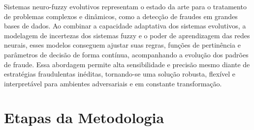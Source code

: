 
Sistemas neuro-fuzzy evolutivos representam o estado da arte para o tratamento de problemas complexos e dinâmicos, como a detecção de fraudes em grandes bases de dados. Ao combinar a capacidade adaptativa dos sistemas evolutivos, a modelagem de incertezas dos sistemas fuzzy e o poder de aprendizagem das redes neurais, esses modelos conseguem ajustar suas regras, funções de pertinência e parâmetros de decisão de forma contínua, acompanhando a evolução dos padrões de fraude. Essa abordagem permite alta sensibilidade e precisão mesmo diante de estratégias fraudulentas inéditas, tornando-se uma solução robusta, flexível e interpretável para ambientes adversariais e em constante transformação.

\section{Etapas da Metodologia}

